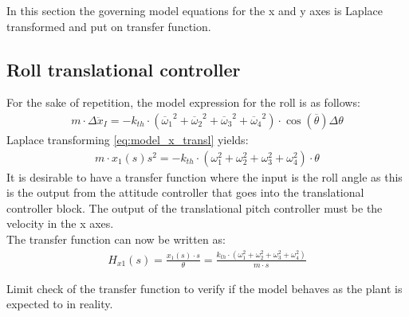 In this section the governing model equations for the x and y axes is Laplace transformed and put on transfer function. 
\subsection*{Roll translational controller}
For the sake of repetition, the model expression for the roll is as follows:
\begin{align}
m\cdot\Delta\ddot{x}_I = -k_{th}\cdot({\overline{\omega}_1}^2+{\overline{\omega}_2}^2+{\overline{\omega}_3}^2+{\overline{\omega}_4}^2)\cdot\cos(\overline{\theta})\Delta\theta
\label{eq:model_x_transl}
\end{align} 
Laplace transforming \autoref{eq:model_x_transl} yields:
\begin{align}
m\cdot x_1(s)s^2=-k_{th}\cdot (\omega_1 ^2 + \omega_2 ^2 + \omega_3 ^2 + \omega_4 ^2)\cdot \theta
\end{align}
It is desirable to have a transfer function where the input is the roll angle as this is the output from the attitude controller that goes into the translational controller block. The output of the translational pitch controller must be the velocity in the x axes. \\
The transfer function can now be written as:
\begin{align}
H_{x1}(s)=\frac{x_1(s) \cdot s}{\theta}=\frac{k_{th}\cdot (\omega_1 ^2 + \omega_2 ^2 + \omega_3 ^2 + \omega_4 ^2)}{m\cdot s}\label{eq:conHx}
\end{align}
\begin{where}
\end{where}
 
Limit check of the transfer function to verify if the model behaves as the plant is expected to in reality. \\\\


